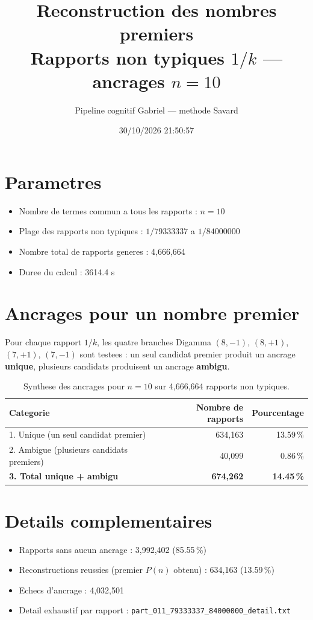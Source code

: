\documentclass[12pt]{article}
\title{Reconstruction des nombres premiers\\Rapports non typiques $1/k$ --- ancrages $n=10$
}
\author{Pipeline cognitif Gabriel --- methode Savard}
\date{30/10/2026 21:50:57}
\begin{document}
\maketitle

\section*{Parametres}
\begin{itemize}
\item Nombre de termes commun a tous les rapports : $n=10$
\item Plage des rapports non typiques : $1/79333337$ a $1/84000000$
\item Nombre total de rapports generes : 4,666,664
\item Duree du calcul : 3614.4 s
\end{itemize}

\section*{Ancrages pour un nombre premier}

Pour chaque rapport $1/k$, les quatre branches Digamma $(8,-1)$, $(8,+1)$, $(7,+1)$, $(7,-1)$ sont testees : un seul candidat premier produit un ancrage \textbf{unique}, plusieurs candidats produisent un ancrage \textbf{ambigu}.

\begin{table}[h!]
\centering
\caption{Synthese des ancrages pour $n=10$ sur 4,666,664 rapports non typiques.}
\begin{tabular}{lrr}
\toprule
\textbf{Categorie} & \textbf{Nombre de rapports} & \textbf{Pourcentage} \\
\midrule
1. Unique (un seul candidat premier) & 634,163 & 13.59\,\% \\
2. Ambigue (plusieurs candidats premiers) & 40,099 & 0.86\,\% \\
\midrule
\textbf{3. Total unique + ambigu} & \textbf{674,262} & \textbf{14.45\,\%} \\
\bottomrule
\end{tabular}
\end{table}

\section*{Details complementaires}
\begin{itemize}
\item Rapports sans aucun ancrage : 3,992,402 (85.55\,\%)
\item Reconstructions reussies (premier $P(n)$ obtenu) : 634,163 (13.59\,\%)
\item Echecs d'ancrage : 4,032,501
\item Detail exhaustif par rapport : \texttt{part_011_79333337_84000000_detail.txt}
\end{itemize}
\end{document}
